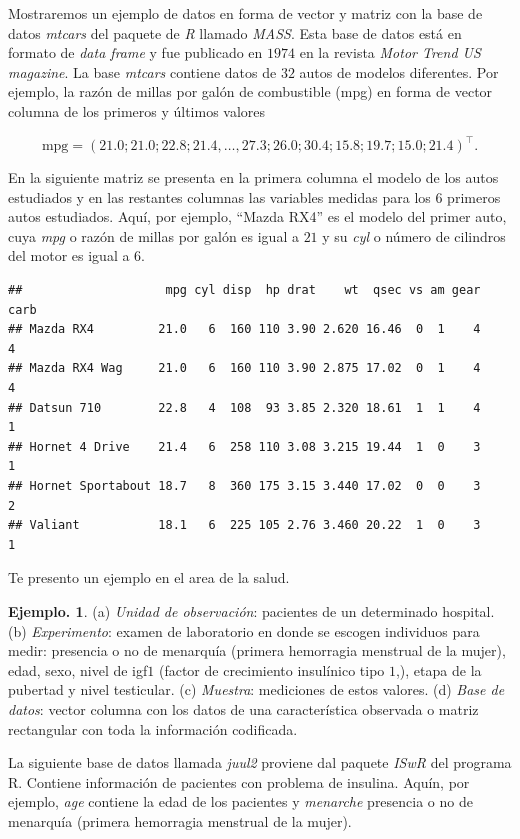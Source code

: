 \documentclass[]{book}
\theoremstyle{definition}
\theoremstyle{definition}
\newtheorem{example}{Ejemplo.}[chapter]
\theoremstyle{definition}
\theoremstyle{remark}
\begin{document}
Mostraremos un ejemplo de datos en forma de vector y
matriz con la base de datos \emph{mtcars} del
paquete de \emph{R} llamado \emph{MASS}. Esta base de datos está en
formato de \emph{data frame} y fue publicado
en \(1974\) en la revista \emph{Motor Trend US magazine}. La
base \emph{mtcars} contiene datos de \(32\) autos
de modelos diferentes. Por ejemplo, la razón de millas
por galón de combustible (mpg) en forma de
vector columna de los primeros y últimos valores

\[\mbox{mpg}=(21.0 ; 21.0 ; 22.8 ; 21.4 ,\ldots, 27.3 ;
26.0 ; 30.4 ; 15.8 ; 19.7 ; 15.0 ;
21.4)^\top. \]

En la siguiente matriz se presenta en la primera columna
el modelo de los autos estudiados y en
las restantes columnas las variables medidas para los \(6\)
primeros autos estudiados. Aquí, por
ejemplo, ``Mazda RX4'' es el modelo del primer auto, cuya
\emph{mpg} o razón de millas por galón es
igual a \(21\) y su \emph{cyl} o número de cilindros del motor
es igual a \(6\).

\begin{verbatim}
##                    mpg cyl disp  hp drat    wt  qsec vs am gear carb
## Mazda RX4         21.0   6  160 110 3.90 2.620 16.46  0  1    4    4
## Mazda RX4 Wag     21.0   6  160 110 3.90 2.875 17.02  0  1    4    4
## Datsun 710        22.8   4  108  93 3.85 2.320 18.61  1  1    4    1
## Hornet 4 Drive    21.4   6  258 110 3.08 3.215 19.44  1  0    3    1
## Hornet Sportabout 18.7   8  360 175 3.15 3.440 17.02  0  0    3    2
## Valiant           18.1   6  225 105 2.76 3.460 20.22  1  0    3    1
\end{verbatim}

Te presento un ejemplo en el area de la salud.

\begin{example}
\protect\hypertarget{exm:unnamed-chunk-15}{}{\label{exm:unnamed-chunk-15} }(a) \emph{Unidad de observación}: pacientes de un determinado
hospital. (b) \emph{Experimento}: examen de
laboratorio en donde se escogen individuos para medir:
presencia o no de menarquía (primera
hemorragia menstrual de la mujer), edad, sexo, nivel de
igf\(1\) (factor de crecimiento insulínico
tipo \(1\),), etapa de la pubertad y nivel testicular. (c)
\emph{Muestra}: mediciones de estos valores.
(d) \emph{Base de datos}: vector columna con los datos de una
característica observada o matriz
rectangular con toda la información codificada.
\end{example}

La siguiente base de datos llamada \emph{juul2} proviene dal
paquete \emph{ISwR} del programa R. Contiene
información de pacientes con problema de insulina. Aquín,
por ejemplo, \emph{age} contiene la edad de
los pacientes y \emph{menarche} presencia o no de menarquía
(primera hemorragia menstrual de la
mujer).
\end{document}
